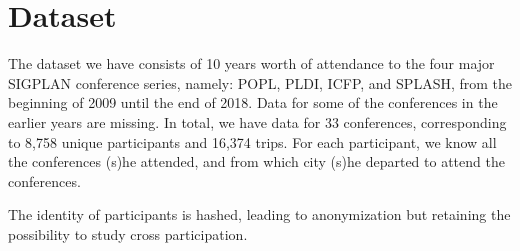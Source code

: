 \section{Dataset}
\label{sec:dataset}
 
The dataset we have consists of 10 years worth of attendance to the four major
SIGPLAN conference series, namely: POPL, PLDI, ICFP, and SPLASH, from the
beginning of 2009 until the end of 2018. Data for some of the conferences in the
earlier years are missing. In total, we have data for 33 conferences,
corresponding to 8,758 unique participants and 16,374 trips. For each
participant, we know all the conferences (s)he attended, and from which city
(s)he departed to attend the conferences.

The identity of participants is hashed, leading to anonymization but retaining
the possibility to study cross participation.



